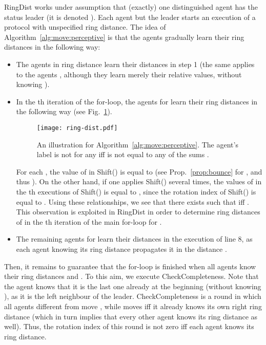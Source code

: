 RingDist works under assumption that (exactly) one distinguished
agent has the status leader (it is denoted ).
Each agent but the leader starts an execution of a protocol with unspecified
ring distance. The idea of Algorithm~\ref{alg:move:perceptive} is that the
agents gradually learn their ring distances in the following way:
\begin{itemize}
\item
The agents in ring distance  learn their distances in step 1
(the same applies to the agents , although they learn merely their
relative values, without knowing ).
\item
In the th iteration of the for-loop, the agents  for 
learn their ring distances in the following way (see Fig.~\ref{fig:ring:dist}).
\begin{figure}[h]
\begin{center}
  \texttt{[image: ring-dist.pdf]}
  \caption{An illustration for Algorithm~\ref{alg:move:perceptive}. The agent's
	label is not  for any  iff  is not equal to any of the sums
	.}
\label{fig:ring:dist}
\end{center}
\end{figure}
For each , the value of  in Shift() is equal to 
(see Prop.~\ref{prop:bounce} for ,  and thus
).
On the other hand, if one applies Shift() several times,
the values of  in the th executions of Shift() is equal to
, since the rotation index of Shift() is equal to .
Using these relationships, we see that there exists  such that 
iff .
This observation is exploited in RingDist in order to determine ring distances of 
in the th iteration of the main for-loop for .

\item
The remaining agents  for  learn their distances
in the execution of line 8, as each agent knowing
its ring distance propagates it in the distance .
\end{itemize}
Then, it remains to guarantee that the for-loop is finished when all agents
know their ring distances and .
To this aim, we execute CheckCompleteness.
Note that the agent  knows
that it is the last one already at the beginning (without knowing ), as it is
the left neighbour of the leader.
CheckCompleteness is a round in which all agents different from  move
{\lleft}, while  moves {\rright} iff it already knows its own
right ring distance (which in turn implies that every other agent knows its ring distance
as well).
Thus, the rotation index of this round is not zero iff each agent knows its ring distance.
